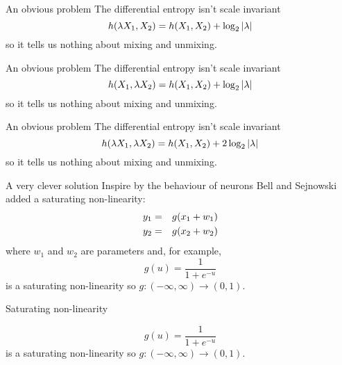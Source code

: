 \documentclass{beamer}
\newcommand{\crish}{\color{reddish}}
\newcommand{\cbla}{\color{black}}
\newcommand{\cblu}{\color{blue}}
\begin{document}
\begin{frame}{An obvious problem}
  The differential entropy isn't scale invariant
  \crish
  $$
  h(\cblu{}\lambda\crish{}{}X_1,X_2)=h(X_1,X_2)+\log_2{|\cblu{}\lambda\crish{}|}
  $$
  \cbla
  so it tells us nothing about mixing and unmixing.
  \end{frame}


\begin{frame}{An obvious problem}
  The differential entropy isn't scale invariant
  \crish
  $$
  h(X_1,\cblu{}\lambda\crish{}{}X_2)=h(X_1,X_2)+\log_2{|\cblu{}\lambda\crish{}|}
  $$
  \cbla
    so it tells us nothing about mixing and unmixing.
  \end{frame}

\begin{frame}{An obvious problem}
  The differential entropy isn't scale invariant
  \crish
  $$
  h(\cblu{}\lambda\crish{}{}X_1,\cblu{}\lambda\crish{}{}X_2)=h(X_1,X_2)+2\log_2{|\cblu{}\lambda\crish{}|}
  $$
  \cbla
    so it tells us nothing about mixing and unmixing.
\end{frame}

\begin{frame}{A very clever solution}
  Inspire by the behaviour of neurons Bell and Sejnowski added a saturating non-linearity:
  \crish
  \begin{eqnarray*}
y_1&=&g(x_1+w_1)\cr
y_2&=&g(x_2+w_2)
\end{eqnarray*}
  \cbla
  where  \crish$w_1$\cbla{} and \crish$w_2$\cbla{} are parameters and, for example,
\crish $$
g(u)=\frac{1}{1+e^{-u}}
$$ \cbla{}
is a saturating non-linearity so \crish$g:(-\infty,\infty)\rightarrow (0,1)$.\cbla{}
  \vfill
\end{frame}


\begin{frame}{Saturating non-linearity}

\crish $$
g(u)=\frac{1}{1+e^{-u}}
$$ \cbla{}
is a saturating non-linearity so \crish$g:(-\infty,\infty)\rightarrow (0,1)$.\cbla{}
\begin{center}
\end{center}
\end{frame}
\end{document}
